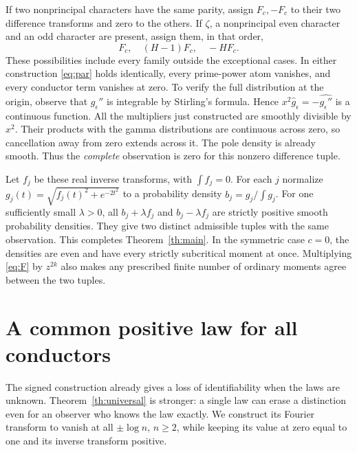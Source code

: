 \documentclass[11pt]{article}
\begin{document}
If two nonprincipal characters have the same parity, assign \(F_c,-F_c\) to their two difference transforms and zero to the others. If \(\zeta\), a nonprincipal even character and an odd character are present, assign them, in that order,
\begin{equation}\label{eq:triple}
                        F_c,\quad (H-1)F_c,\quad -H F_c .
\end{equation}
These possibilities include every family outside the exceptional cases. In either construction \eqref{eq:par} holds identically, every prime-power atom vanishes, and every conductor term vanishes at zero. To verify the full distribution at the origin, observe that \(g_\epsilon''\) is integrable by Stirling's formula. Hence \(x^2\widehat g_\epsilon=-\widehat{g_\epsilon''}\) is a continuous function. All the multipliers just constructed are smoothly divisible by \(x^2\). Their products with the gamma distributions are continuous across zero, so cancellation away from zero extends across it. The pole density is already smooth. Thus the \emph{complete} observation is zero for this nonzero difference tuple.

Let \(f_j\) be these real inverse transforms, with \(\int f_j=0\). For each \(j\) normalize \(g_j(t)=\sqrt{f_j(t)^2+e^{-2t^2}}\) to a probability density \(b_j=g_j/\int g_j\). For one sufficiently small \(\lambda>0\), all \(b_j+\lambda f_j\) and \(b_j-\lambda f_j\) are strictly positive smooth probability densities. They give two distinct admissible tuples with the same observation. This completes Theorem~\ref{th:main}. In the symmetric case \(c=0\), the densities are even and have every strictly subcritical moment at once. Multiplying \eqref{eq:F} by \(z^{2k}\) also makes any prescribed finite number of ordinary moments agree between the two tuples.

\section{A common positive law for all conductors}\label{sec:positive}
The signed construction already gives a loss of identifiability when the laws are unknown. Theorem~\ref{th:universal} is stronger: a single law can erase a distinction even for an observer who knows the law exactly. We construct its Fourier transform to vanish at all \(\pm\log n\), \(n\ge2\), while keeping its value at zero equal to one and its inverse transform positive.
\end{document}
